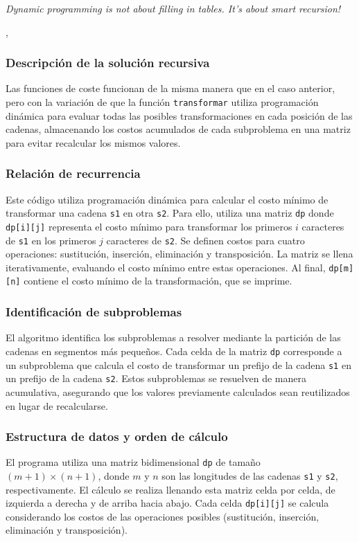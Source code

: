 
\epigraph{\textit{Dynamic programming is not about filling in tables. It's about smart recursion!}}{\citeauthor{algorithms_erickson}, \citeyear{algorithms_erickson} \cite{algorithms_erickson}}

\subsubsection{Descripción de la solución recursiva}
Las funciones de coste funcionan de la misma manera que en el caso anterior, pero con la variación de que la función \texttt{transformar} utiliza programación dinámica para evaluar todas las posibles transformaciones en cada posición de las cadenas, almacenando los costos acumulados de cada subproblema en una matriz para evitar recalcular los mismos valores.

\subsubsection{Relación de recurrencia}
Este código utiliza programación dinámica para calcular el costo mínimo de transformar una cadena \texttt{s1} en otra \texttt{s2}. Para ello, utiliza una matriz \texttt{dp} donde \texttt{dp[i][j]} representa el costo mínimo para transformar los primeros \(i\) caracteres de \texttt{s1} en los primeros \(j\) caracteres de \texttt{s2}. Se definen costos para cuatro operaciones: sustitución, inserción, eliminación y transposición. La matriz se llena iterativamente, evaluando el costo mínimo entre estas operaciones. Al final, \texttt{dp[m][n]} contiene el costo mínimo de la transformación, que se imprime.

\subsubsection{Identificación de subproblemas}
El algoritmo identifica los subproblemas a resolver mediante la partición de las cadenas en segmentos más pequeños. Cada celda de la matriz \texttt{dp} corresponde a un subproblema que calcula el costo de transformar un prefijo de la cadena \texttt{s1} en un prefijo de la cadena \texttt{s2}. Estos subproblemas se resuelven de manera acumulativa, asegurando que los valores previamente calculados sean reutilizados en lugar de recalcularse.

\subsubsection{Estructura de datos y orden de cálculo}
El programa utiliza una matriz bidimensional \texttt{dp} de tamaño \( (m+1) \times (n+1) \), donde \(m\) y \(n\) son las longitudes de las cadenas \texttt{s1} y \texttt{s2}, respectivamente. El cálculo se realiza llenando esta matriz celda por celda, de izquierda a derecha y de arriba hacia abajo. Cada celda \texttt{dp[i][j]} se calcula considerando los costos de las operaciones posibles (sustitución, inserción, eliminación y transposición).

